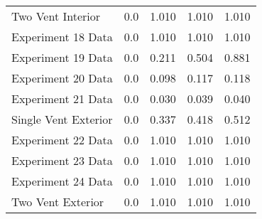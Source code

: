 \begin{tabular}{lrrrr}
Two Vent Interior    &       0.0 &            1.010 &            1.010 &      1.010 \\
Experiment 18 Data   &       0.0 &            1.010 &            1.010 &      1.010 \\
Experiment 19 Data   &       0.0 &            0.211 &            0.504 &      0.881 \\
Experiment 20 Data   &       0.0 &            0.098 &            0.117 &      0.118 \\
Experiment 21 Data   &       0.0 &            0.030 &            0.039 &      0.040 \\
Single Vent Exterior &       0.0 &            0.337 &            0.418 &      0.512 \\
Experiment 22 Data   &       0.0 &            1.010 &            1.010 &      1.010 \\
Experiment 23 Data   &       0.0 &            1.010 &            1.010 &      1.010 \\
Experiment 24 Data   &       0.0 &            1.010 &            1.010 &      1.010 \\
Two Vent Exterior    &       0.0 &            1.010 &            1.010 &      1.010 \\
\bottomrule
\end{tabular}
